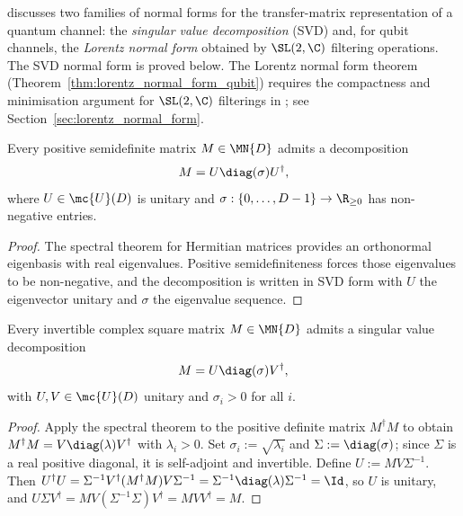 \cite[Section~2.3]{Wolf2012Quantum} discusses two families of normal forms for
the transfer-matrix representation of a quantum channel: the \emph{singular
    value decomposition} (SVD) and, for qubit channels, the \emph{Lorentz normal
    form} obtained by $\SL(2, \C)$ filtering operations. The SVD
normal form is proved below. The Lorentz normal form theorem
(Theorem~\ref{thm:lorentz_normal_form_qubit}) requires the compactness and
minimisation argument for $\SL(2, \C)$ filterings in
\cite[Propositions~2.9 and~2.11]{Wolf2012Quantum}; see
Section~\ref{sec:lorentz_normal_form}.

\begin{theorem}
    \label{thm:svd_posSemidef}
    \leanok
    Every positive semidefinite matrix $M \in \MN{D}$ admits a decomposition
    \[
        M = U \diag(\sigma) U^{\dagger},
    \]
    where $U \in \mc{U}(D)$ is unitary and $\sigma : \{0, \ldots, D-1\} \to
        \R_{\ge 0}$ has non-negative entries.
\end{theorem}

\begin{proof}\leanok
    The spectral theorem for Hermitian matrices provides an orthonormal
    eigenbasis with real eigenvalues. Positive semidefiniteness forces those
    eigenvalues to be non-negative, and the decomposition is written in SVD
    form with $U$ the eigenvector unitary and $\sigma$ the eigenvalue sequence.
\end{proof}

\begin{theorem}
    \label{thm:svd_of_isUnit}
    \leanok
    Every invertible complex square matrix $M \in \MN{D}$ admits a singular
    value decomposition
    \[
        M = U \diag(\sigma) V^{\dagger},
    \]
    with $U, V \in \mc{U}(D)$ unitary and $\sigma_i > 0$ for all $i$.
\end{theorem}

\begin{proof}\leanok
    Apply the spectral theorem to the positive definite matrix
    $M^{\dagger} M$ to obtain $M^{\dagger} M = V \diag(\lambda)
        V^{\dagger}$ with $\lambda_i > 0$. Set $\sigma_i := \sqrt{\lambda_i}$ and
    $\Sigma := \diag(\sigma)$; since $\Sigma$ is a real positive
    diagonal, it is self-adjoint and invertible. Define $U := M V \Sigma^{-1}$.
    Then $U^{\dagger} U = \Sigma^{-1} V^{\dagger} (M^{\dagger} M) V \Sigma^{-1}
        = \Sigma^{-1} \diag(\lambda) \Sigma^{-1} = \Id$, so $U$ is
    unitary, and $U \Sigma V^{\dagger} = M V (\Sigma^{-1} \Sigma) V^{\dagger} =
        M V V^{\dagger} = M$.
\end{proof}

